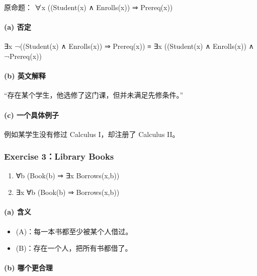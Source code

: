 \documentclass[
  11pt,
]{article}
\providecommand{\tightlist}{%
  \setlength{\itemsep}{0pt}\setlength{\parskip}{0pt}}
\begin{document}
原命题： ∀x ((Student(x) ∧ Enrolls(x)) ⇒ Prereq(x))

\paragraph{(a) 否定}\label{a-ux5426ux5b9a}

∃x ¬((Student(x) ∧ Enrolls(x)) ⇒ Prereq(x)) ≡ ∃x ((Student(x) ∧
Enrolls(x)) ∧ ¬Prereq(x))

\paragraph{(b) 英文解释}\label{b-ux82f1ux6587ux89e3ux91ca-1}

``存在某个学生，他选修了这门课，但并未满足先修条件。''

\paragraph{(c)
一个具体例子}\label{c-ux4e00ux4e2aux5177ux4f53ux4f8bux5b50}

例如某学生没有修过 Calculus I，却注册了 Calculus II。

\subsubsection{Exercise 3：Library Books}\label{exercise-3library-books}

\begin{enumerate}
\def\labelenumi{(\Alph{enumi})}
\tightlist
\item
  ∀b (Book(b) ⇒ ∃x Borrows(x,b))\\
\item
  ∃x ∀b (Book(b) ⇒ Borrows(x,b))
\end{enumerate}

\paragraph{(a) 含义}\label{a-ux542bux4e49}

\begin{itemize}
\tightlist
\item
  (A)：每一本书都至少被某个人借过。
\item
  (B)：存在一个人，把所有书都借了。
\end{itemize}

\paragraph{(b) 哪个更合理}\label{b-ux54eaux4e2aux66f4ux5408ux7406}
\end{document}
